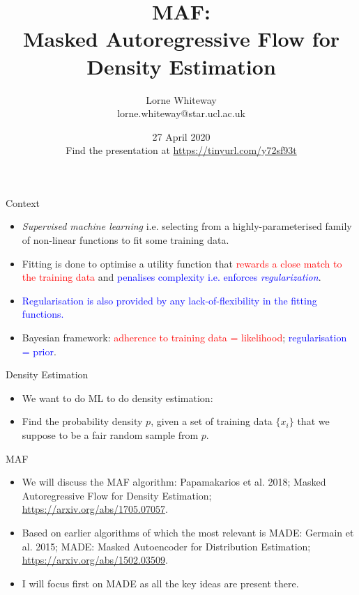 \documentclass[usenames,dvipsnames]{beamer}
\title{MAF: \\ Masked Autoregressive Flow for Density Estimation}
\author{Lorne Whiteway \\ lorne.whiteway@star.ucl.ac.uk}
\institute{Astrophysics Group \\ Department of Physics and Astronomy \\ University College London}
\date{27 April 2020 \\ Find the presentation at \alert{\url{https://tinyurl.com/y72sf93t}}}
\begin{document}
\frame{\titlepage}

\begin{frame}{Context}
  \begin{block}{}
    \begin{itemize}
      \item{\textit{Supervised machine learning} i.e. selecting from a highly-parameterised family of non-linear functions to fit some training data.}
      \item{Fitting is done to optimise a utility function that \textcolor{red}{rewards a close match to the training data} and \textcolor{blue}{penalises complexity i.e. enforces \textit{regularization}}.}
      \item{\textcolor{blue}{Regularisation is also provided by any lack-of-flexibility in the fitting functions.}}
      \item{Bayesian framework: \textcolor{red}{adherence to training data = likelihood}; \textcolor{blue}{regularisation = prior}.}
    \end{itemize}
  \end{block}
\end{frame}

\begin{frame}{Density Estimation}
  \begin{block}{}
    \begin{itemize}
      \item{We want to do ML to do density estimation:}
      \item{Find the probability density $p$, given a set of training data $\{x_i\}$ that we suppose to be a fair random sample from $p$.}
    \end{itemize}
  \end{block}
\end{frame}

\begin{frame}{MAF}
  \begin{block}{}
    \begin{itemize}
      \item{We will discuss the MAF algorithm: Papamakarios et al. 2018; Masked Autoregressive Flow for Density Estimation; \url{https://arxiv.org/abs/1705.07057}.}
      \item{Based on earlier algorithms of which the most relevant is MADE: Germain et al. 2015; MADE: Masked Autoencoder for Distribution Estimation; \url{https://arxiv.org/abs/1502.03509}.}
	\item{I will focus first on MADE as all the key ideas are present there.}
    \end{itemize}
  \end{block}
\end{frame}
\end{document}
